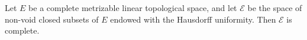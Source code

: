 Let $E$ be a complete metrizable linear topological space, and let $\mathcal{E}$ be the space of non-void closed subsets of $E$ endowed with the Hausdorff uniformity. Then $\mathcal{E}$ is complete.
